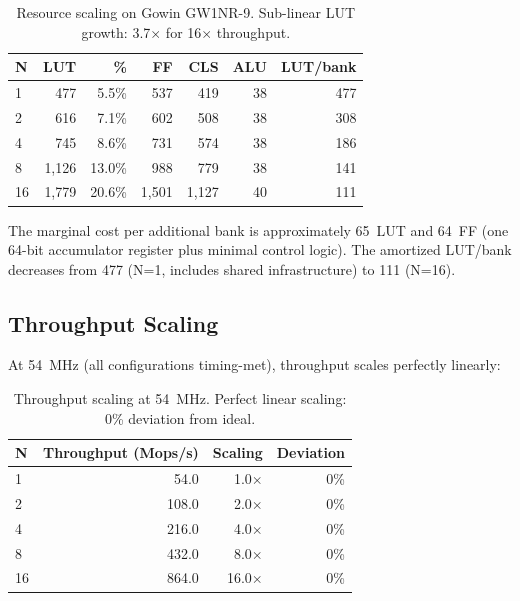 \documentclass[11pt,letterpaper]{article}
\theoremstyle{plain}
\theoremstyle{definition}
\theoremstyle{remark}
\begin{document}
\begin{table}[!htbp]
\centering
\caption{Resource scaling on Gowin GW1NR-9. Sub-linear LUT growth: 3.7$\times$ for 16$\times$ throughput.}
\label{tab:resources}
\begin{tabular}{@{}lrrrrrr@{}}
\toprule
\textbf{N} & \textbf{LUT} & \textbf{\%} & \textbf{FF} & \textbf{CLS} & \textbf{ALU} & \textbf{LUT/bank} \\
\midrule
1  & 477   & 5.5\%  & 537   & 419   & 38 & 477 \\
2  & 616   & 7.1\%  & 602   & 508   & 38 & 308 \\
4  & 745   & 8.6\%  & 731   & 574   & 38 & 186 \\
8  & 1,126 & 13.0\% & 988   & 779   & 38 & 141 \\
16 & 1,779 & 20.6\% & 1,501 & 1,127 & 40 & 111 \\
\bottomrule
\end{tabular}
\end{table}

The marginal cost per additional bank is approximately 65~LUT and 64~FF (one 64-bit accumulator register plus minimal control logic). The amortized LUT/bank decreases from 477 (N=1, includes shared infrastructure) to 111 (N=16).

\subsection{Throughput Scaling}

At 54~MHz (all configurations timing-met), throughput scales perfectly linearly:

\begin{table}[!htbp]
\centering
\caption{Throughput scaling at 54~MHz. Perfect linear scaling: 0\% deviation from ideal.}
\label{tab:throughput}
\begin{tabular}{@{}lrrr@{}}
\toprule
\textbf{N} & \textbf{Throughput (Mops/s)} & \textbf{Scaling} & \textbf{Deviation} \\
\midrule
1  & 54.0   & 1.0$\times$  & 0\% \\
2  & 108.0  & 2.0$\times$  & 0\% \\
4  & 216.0  & 4.0$\times$  & 0\% \\
8  & 432.0  & 8.0$\times$  & 0\% \\
16 & 864.0  & 16.0$\times$ & 0\% \\
\bottomrule
\end{tabular}
\end{table}
\end{document}
